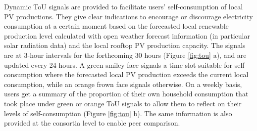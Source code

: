 Dynamic ToU signals are provided to facilitate users' self-consumption of local PV productions.
They give clear indications to encourage or discourage electricity consumption at a certain moment based on the forecasted local renewable production level calculated with open weather forecast information (in particular solar radiation data) and the local rooftop PV production capacity. 
The signals are at 3-hour intervals for the forthcoming 30 hours (Figure \ref{fig:tou} a), and are updated every 24 hours. A green smiley face signals a time slot suitable for self-consumption where the forecasted local PV production exceeds the current local consumption, while an orange frown face signals otherwise.  
% 
On a weekly basis, users get a summary of the proportion of their own household consumption that took place under green or orange ToU signals to allow them to reflect on their levels of self-consumption (Figure \ref{fig:tou} b). The same information is also provided at the consortia level to enable peer comparison. 



